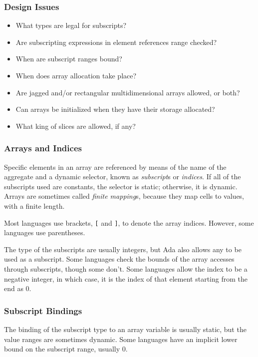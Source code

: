 \subsubsection{Design Issues}\label{subsubsec:Arrays-Design_Issues}
\begin{itemize}[noitemsep]
\item What types are legal for subscripts?
\item Are subscripting expressions in element references range checked?
\item When are subscript ranges bound?
\item When does array allocation take place?
\item Are jagged and/or rectangular multidimensional arrays allowed, or both?
\item Can arrays be initialized when they have their storage allocated?
\item What king of slices are allowed, if any?
\end{itemize}

\subsubsection{Arrays and Indices}\label{subsubsec:Arrays-Arrays_and_Indices}
Specific elements in an array are referenced by means of the name of the aggregate and a dynamic selector, known as \emph{subscript}s or \emph{indices}.
If all of the subscripts used are constants, the selector is static; otherwise, it is dynamic.
Arrays are sometimes called \emph{finite mapping}s, because they map  cells to values, with a finite length.

Most languages use brackets, \texttt{[} and \texttt{]}, to denote the array indices.
However, some languages use parentheses.

The type of the subscripts are usually integers, but Ada also allows any  to be used as a subscript.
Some languages check the bounds of the array accesses through subscripts, though some don't.
Some languages allow the index to be a negative integer, in which case, it is the index of that element starting from the end as 0.

\subsubsection{Subscript Bindings}\label{subsubsec:Arrays-Subscript_Bindings}
The binding of the subscript type to an array variable is usually static, but the value ranges are sometimes dynamic.
Some languages have an implicit lower bound on the subscript range, usually 0.

